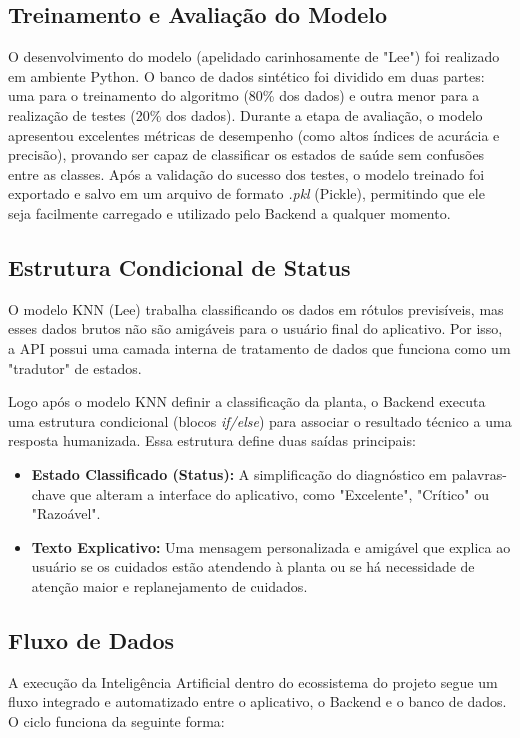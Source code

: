 \documentclass[
	12pt,
	article,
	oneside,
	a4paper,
	english,
	brazil
	]{abntex2}
\begin{document}
\subsection{Treinamento e Avaliação do Modelo}
O desenvolvimento do modelo (apelidado carinhosamente de "Lee") foi realizado em ambiente Python. O banco de dados sintético foi dividido em duas partes: uma para o treinamento do algoritmo (80\% dos dados) e outra menor para a realização de testes (20\% dos dados). Durante a etapa de avaliação, o modelo apresentou excelentes métricas de desempenho (como altos índices de acurácia e precisão), provando ser capaz de classificar os estados de saúde sem confusões entre as classes. Após a validação do sucesso dos testes, o modelo treinado foi exportado e salvo em um arquivo de formato \textit{.pkl} (Pickle), permitindo que ele seja facilmente carregado e utilizado pelo Backend a qualquer momento.

\subsection{Estrutura Condicional de Status}
O modelo KNN (Lee) trabalha classificando os dados em rótulos previsíveis, mas esses dados brutos não são amigáveis para o usuário final do aplicativo. Por isso, a API possui uma camada interna de tratamento de dados que funciona como um "tradutor" de estados.

Logo após o modelo KNN definir a classificação da planta, o Backend executa uma estrutura condicional (blocos \textit{if/else}) para associar o resultado técnico a uma resposta humanizada. Essa estrutura define duas saídas principais:

\begin{itemize}
    \item \textbf{Estado Classificado (Status):} A simplificação do diagnóstico em palavras-chave que alteram a interface do aplicativo, como "Excelente", "Crítico" ou "Razoável".
    \item \textbf{Texto Explicativo:} Uma mensagem personalizada e amigável que explica ao usuário se os cuidados estão atendendo à planta ou se há necessidade de atenção maior e replanejamento de cuidados.
\end{itemize}

\subsection{Fluxo de Dados}
A execução da Inteligência Artificial dentro do ecossistema do projeto segue um fluxo integrado e automatizado entre o aplicativo, o Backend e o banco de dados. O ciclo funciona da seguinte forma:
\end{document}

